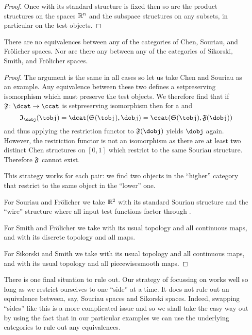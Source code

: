 \documentclass[%
a4paper,%
arxiv,%
defaults
]{myclass}
\begin{document}
\begin{proof}
Once \R with its standard structure is fixed then so are the product structures on the spaces \(\mathbb{R}^n\) and the subspace structures on any subsets, in particular on the test objects.
\end{proof}

\begin{corollary}
There are no equivalences between any of the categories of Chen, Souriau, and Fr\"olicher spaces.
Nor are there any between any of the categories of Sikorski, Smith, and Fr\"olicher spaces.
\end{corollary}

\begin{proof}
The argument is the same in all cases so let us take Chen and Souriau as an example.
Any equivalence between these two defines a set\enhyp{}preserving isomorphism which must preserve the test objects.
We therefore find that if \(\func{F} \colon \dcat \to \ccat\) is set\enhyp{}preserving isomorphism then for a \dobj[\dobj] and \tobj[\tobj]
%
\[
  \itest_{\dobj}(\tobj) = \Hom{\dcat}{\sfunc(\tobj)}{\dobj} = \Hom{\ccat}{\sfunc(\tobj)}{\func{F}(\dobj)}
\]
%
and thus applying the restriction functor to \(\func{F}(\dobj)\) yields \(\dobj\) again.
However, the restriction functor is not an isomorphism as there are at least two distinct Chen structures on \([0,1]\) which restrict to the same Souriau structure.
Therefore \(\func{F}\) cannot exist.

This strategy works for each pair: we find two objects in the ``higher'' category that restrict to the same object in the ``lower'' one.

For Souriau and Fr\"olicher we take \(\mathbb{R}^2\) with its standard Souriau structure and the ``wire'' structure where all input test functions factor through \R.

For Smith and Fr\"olicher we take \R with its usual topology and all continuous maps, and \R with its discrete topology and all maps.

For Sikorski and Smith we take \R with its usual topology and all continuous maps, and \R with its usual topology and all piecewise\enhyp{}smooth maps.
\end{proof}

There is one final situation to rule out.
Our strategy of focussing on \R works well so long as we restrict ourselves to one ``side'' at a time.
It does not rule out an equivalence between, say, Souriau spaces and Sikorski spaces.
Indeed, swapping ``sides'' like this is a more complicated issue and so we shall take the easy way out by using the fact that in our particular examples we can use the underlying categories to rule out any equivalences.
\end{document}

